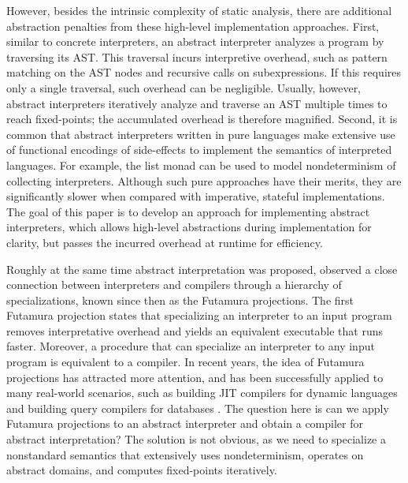 However, besides the intrinsic complexity of static analysis, there are
additional abstraction penalties from these high-level implementation
approaches. First, similar to concrete interpreters, an abstract interpreter
analyzes a program by traversing its AST. This traversal incurs interpretive
overhead, such as pattern matching on the AST nodes and recursive calls on
subexpressions. If this requires only a single traversal, such overhead can be
negligible. Usually, however, abstract interpreters iteratively analyze and
traverse an AST multiple times to reach fixed-points; the accumulated overhead
is therefore magnified.
Second, it is common that abstract interpreters written in pure languages make
extensive use of functional encodings of side-effects to implement the semantics
of interpreted languages. For example, the list monad can be used to model
nondeterminism of collecting interpreters. Although such pure approaches have
their merits, they are significantly slower when compared with imperative,
stateful implementations. The goal of this paper is to develop an approach for
implementing abstract interpreters, which allows high-level abstractions during
implementation for clarity, but passes the incurred overhead at runtime for
efficiency.

Roughly at the same time abstract interpretation was proposed,
\citet{futamura1971partial} observed a close connection between interpreters and
compilers through a hierarchy of specializations, known since then as the
Futamura projections. 
The first Futamura projection states that specializing an interpreter to an
input program removes interpretative overhead and yields an equivalent
executable that runs faster. Moreover, a procedure that can specialize an
interpreter to any input program is equivalent to a compiler.
In recent years, the idea of Futamura projections has attracted more attention,
and has been successfully applied to many real-world scenarios, such as
building JIT compilers for dynamic languages
\cite{Bolz:2009:TMP:1565824.1565827, Marr:2015:TVP:2814270.2814275} and building query
compilers for databases \cite{DBLP:conf/sigmod/TahboubER18, DBLP:conf/osdi/EssertelTDBOR18}.
The question here is can we apply Futamura projections to an abstract
interpreter and obtain a compiler for abstract interpretation?
The solution is not obvious, as we need to specialize a nonstandard
semantics that extensively uses nondeterminism, operates on abstract domains,
and computes fixed-points iteratively. 


